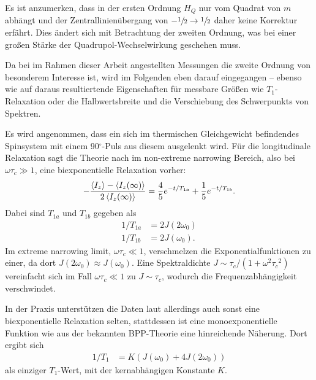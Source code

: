 Es ist anzumerken, dass in der ersten Ordnung $H_Q$ nur vom Quadrat von $m$ abhängt und der Zentrallinienübergang von $-\sfrac{1}{2} \to \sfrac{1}{2}$ daher keine Korrektur erfährt. Dies ändert sich mit Betrachtung der zweiten Ordnung, was bei einer großen Stärke der Quadrupol-Wechselwirkung geschehen muss.

\par\bigskip

Da bei im Rahmen dieser Arbeit angestellten Messungen die zweite Ordnung von besonderem Interesse ist, wird im Folgenden eben darauf eingegangen -- ebenso wie auf daraus resultiertende Eigenschaften für messbare Größen wie $T_1$-Relaxation oder die Halbwertsbreite und die Verschiebung des Schwerpunkts von Spektren.

Es wird angenommen, dass ein sich im thermischen Gleichgewicht befindendes Spinsystem mit einem 90$^\circ$-Puls aus diesem ausgelenkt wird. Für die longitudinale Relaxation sagt die Theorie nach \cite{hubbard} im non-extreme narrowing Bereich, also bei $\omega \tau_c \gg 1$, eine biexponentielle Relaxation vorher:
\begin{align}
    - \frac{\Braket{I_z} - \Braket{I_z(\infty)}}{2\Braket{I_z(\infty)}} = \frac{4}{5}e^{-t/T_{1a}} + \frac{1}{5}e^{-t/T_{1b}}.
\end{align}
Dabei sind $T_{1a}$ und $T_{1b}$ gegeben als
\begin{align}
    1/T_{1a} &= 2J(2\omega_0) \\
    1/T_{1b} &= 2J(\omega_0).
\end{align}
Im extreme narrowing limit, $\omega \tau_c \ll 1$, verschmelzen die Exponentialfunktionen zu einer, da dort $J(2\omega_0) \approx J(\omega_0)$. Eine Spektraldichte $J \sim \tau_c / (1 + \omega^2 {\tau_c}^2)$ vereinfacht sich im Fall $\omega \tau_c \ll 1$ zu $J \sim \tau_c$, wodurch die Frequenzabhängigkeit verschwindet.

In der Praxis unterstützen die Daten laut \cite{eckert} allerdings auch sonst eine biexponentielle Relaxation selten, stattdessen ist eine monoexponentielle Funktion wie aus der bekannten BPP-Theorie \cite{bpp} eine hinreichende Näherung. Dort ergibt sich
\begin{align}
    1/T_1 &= K (J(\omega_0) + 4J(2\omega_0)) \label{eqn:bpp}
\end{align}
als einziger $T_1$-Wert, mit der kernabhängigen Konstante $K$.

